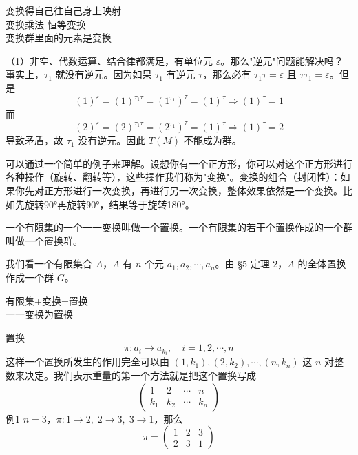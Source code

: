 \begin{note}[变换群]
变换得自己往自己身上映射 \\
变换乘法 恒等变换 \\
变换群里面的元素是变换
\end{note}

\begin{note}[变换群证明]
（1）非空、代数运算、结合律都满足，有单位元 $\varepsilon$。那么"逆元"问题能解决吗？事实上，$\tau_1$ 就没有逆元。因为如果 $\tau_1$ 有逆元 $\tau$，那么必有 $\tau_1\tau=\varepsilon$ 且 $\tau\tau_1=\varepsilon$。但是
\[
(1)^\varepsilon=(1)^{\tau_1\tau}=(1^{\tau_1})^\tau=(1)^\tau\Rightarrow(1)^\tau=1
\]
而
\[
(2)^\varepsilon=(2)^{\tau_1\tau}=(2^{\tau_1})^\tau=(1)^\tau\Rightarrow(1)^\tau=2
\]
导致矛盾，故 $\tau_1$ 没有逆元。因此 $T(M)$ 不能成为群。
\end{note}

\begin{note}[变化群的意义]
可以通过一个简单的例子来理解。设想你有一个正方形，你可以对这个正方形进行各种操作（旋转、翻转等），这些操作我们称为"变换"。变换的组合（封闭性）：如果你先对正方形进行一次变换，再进行另一次变换，整体效果依然是一个变换。比如先旋转90°再旋转90°，结果等于旋转180°。
\end{note}

\begin{definition}[置换与置换群]
一个有限集的一个一一变换叫做一个置换。一个有限集的若干个置换作成的一个群叫做一个置换群。

我们看一个有限集合 $A$，$A$ 有 $n$ 个元 $a_1,a_2,\cdots,a_n$。由 §5 定理 2，$A$ 的全体置换作成一个群 $G$。
\end{definition}

\begin{note}[置换与置换群]
有限集+变换=置换 \\
一一变换为置换
\end{note}

\begin{definition}[置换的书写方式]
置换
\[
\pi:a_i\longrightarrow a_{k_i},\quad i=1,2,\cdots,n
\]
这样一个置换所发生的作用完全可以由 $(1,k_1),(2,k_2),\cdots,(n,k_n)$ 这 $n$ 对整数来决定。我们表示重量的第一个方法就是把这个置换写成
\[
\begin{pmatrix}1&2&\cdots&n\\k_1&k_2&\cdots&k_n\end{pmatrix}
\]
例1 $n=3$，$\pi:1\to2,\;2\to3,\;3\to1$，那么
\[
\pi=\begin{pmatrix}1&2&3\\2&3&1\end{pmatrix}
\]
\end{definition}

